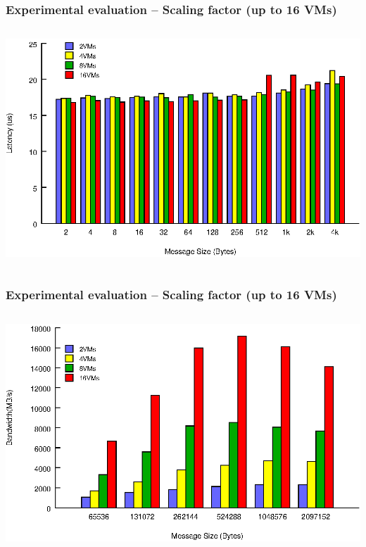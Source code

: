 \documentclass[red,slidestop,notes,compress,mathserif]{beamer}
\begin{document}
\begin{frame}
\frametitle{Experimental evaluation -- Scaling factor (up to 16 VMs)}
\begin{columns}
\includegraphics[width=\textwidth]{figures/lat_stream_scale.eps}
\end{columns}

\end{frame}
\begin{frame}
\frametitle{Experimental evaluation -- Scaling factor (up to 16 VMs)}
\begin{columns}
\includegraphics[width=\textwidth]{figures/bw_stream_scale.eps}
\end{columns}
\end{frame}
\end{document}
